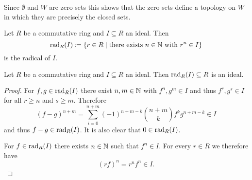 \begin{rem}
 Since $\emptyset$ and $W$ are zero sets this shows that the zero sets define a topology on $W$ in which they are precisely the closed sets.
\end{rem}


\begin{defi}
 Let $R$ be a commutative ring and $I \subseteq R$ an ideal. Then
 \[
  \operatorname{rad}_R(I) \coloneqq \{r \in R \mid \text{there exists } n \in \mathbb{N} \text{ with } r^n \in I\}
 \]
 is the radical of $I$.
\end{defi}


\begin{lem}
 Let $R$ be a commutative ring and $I \subseteq R$ an ideal. Then $\operatorname{rad}_R(I) \subseteq R$ is an ideal.
\end{lem}
\begin{proof}
 For $f,g \in \operatorname{rad}_R(I)$ there exist $n,m \in \mathbb{N}$ with $f^n, g^m \in I$ and thus $f^r, g^s \in I$ for all $r \geq n$ and $s \geq m$. Therefore
 \[
  (f-g)^{n+m} = \sum_{i=0}^{n+m} (-1)^{n+m-k} \binom{n+m}{k} f^k g^{n+m-k} \in I
 \]
 and thus $f-g \in \operatorname{rad}_R(I)$. It is also clear that $0 \in \operatorname{rad}_R(I)$.
 
 For $f \in \operatorname{rad}_R(I)$ there exists $n \in \mathbb{N}$ such that $f^n \in I$. For every $r \in R$ we therefore have
 \[
  (rf)^n = r^n f^n \in I.
 \]
\end{proof}











































